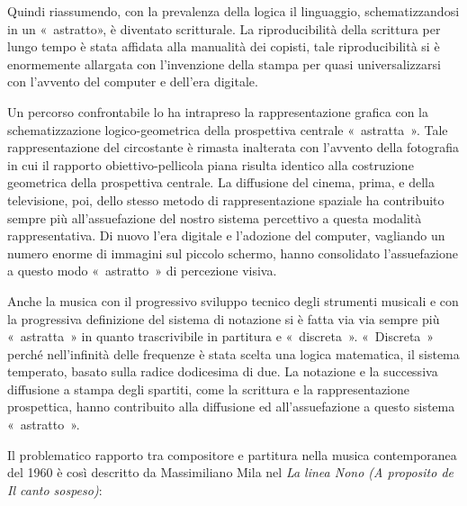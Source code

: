 Quindi riassumendo, con la prevalenza della logica  il linguaggio,
schematizzandosi in un « astratto», è diventato scritturale. La riproducibilità
della scrittura per lungo tempo è stata affidata alla manualità dei copisti,
tale riproducibilità si è enormemente allargata con l’invenzione della stampa
per quasi  universalizzarsi con l’avvento del computer e dell’era digitale.

Un percorso confrontabile lo ha intrapreso la rappresentazione grafica con la
schematizzazione logico-geometrica della prospettiva centrale « astratta ».
Tale rappresentazione  del circostante è rimasta inalterata con l’avvento della
fotografia in cui il rapporto obiettivo-pellicola piana risulta identico alla
costruzione geometrica della prospettiva centrale. La diffusione  del cinema,
prima, e della televisione, poi, dello stesso metodo di rappresentazione
spaziale  ha contribuito sempre più all’assuefazione  del nostro sistema
percettivo  a questa modalità rappresentativa. Di nuovo l’era digitale e
l’adozione del computer, vagliando un numero enorme di immagini sul piccolo
schermo, hanno consolidato l’assuefazione a questo modo « astratto » di
percezione visiva.

Anche la musica con il progressivo sviluppo tecnico degli strumenti musicali e
con la progressiva definizione  del sistema di notazione si è fatta via via
sempre più « astratta » in quanto trascrivibile in partitura  e « discreta ».
« Discreta » perché nell’infinità delle frequenze è stata scelta una logica
matematica, il sistema temperato, basato sulla   radice dodicesima di due.  La
notazione e la successiva diffusione a stampa degli spartiti, come la scrittura
e la rappresentazione prospettica, hanno  contribuito alla diffusione ed
all’assuefazione  a questo sistema « astratto ».

Il problematico rapporto  tra compositore e partitura nella musica contemporanea
del 1960 è così descritto da Massimiliano Mila nel \emph{La linea Nono (A proposito
de Il canto sospeso)}:

